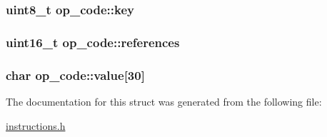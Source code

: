 \subsubsection[{\texorpdfstring{key}{key}}]{\setlength{\rightskip}{0pt plus 5cm}uint8\+\_\+t op\+\_\+code\+::key}\hypertarget{structop__code_adfbb2fc6e07e6fda7e392c0b6f6f64b6}{}\label{structop__code_adfbb2fc6e07e6fda7e392c0b6f6f64b6}
\subsubsection[{\texorpdfstring{references}{references}}]{\setlength{\rightskip}{0pt plus 5cm}uint16\+\_\+t op\+\_\+code\+::references}\hypertarget{structop__code_a8d28fff7d91873f58a4a12205dd0f8e0}{}\label{structop__code_a8d28fff7d91873f58a4a12205dd0f8e0}
\subsubsection[{\texorpdfstring{value}{value}}]{\setlength{\rightskip}{0pt plus 5cm}char op\+\_\+code\+::value\mbox{[}30\mbox{]}}\hypertarget{structop__code_a0b74d91235a8b9f0a36710d68c2746d1}{}\label{structop__code_a0b74d91235a8b9f0a36710d68c2746d1}


The documentation for this struct was generated from the following file\+:\begin{DoxyCompactItemize}
\item 
\hyperlink{instructions_8h}{instructions.\+h}\end{DoxyCompactItemize}
